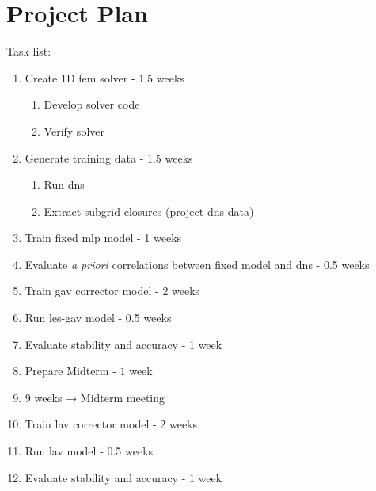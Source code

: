 \section{Project Plan} \label{sec:plan}

Task list:

\begin{enumerate}[label=\textbf{\color{titlecolor}\arabic*.}]
    \item Create 1D \gls{fem} solver - 1.5 weeks
    \begin{enumerate}[label=\textbf{\color{titlecolor}\arabic{enumi}.\alph*}]
        \item Develop solver code
        \item Verify solver
    \end{enumerate}

    \item Generate training data - 1.5 weeks
    \begin{enumerate}[label=\textbf{\color{titlecolor}\arabic{enumi}.\alph*}]
        \item Run \gls{dns}
        \item Extract subgrid closures (project \gls{dns} data)
    \end{enumerate}

    \item Train fixed \gls{mlp} model - 1 weeks

    \item Evaluate \emph{a priori} correlations between fixed model and \gls{dns} - 0.5 weeks

    \item Train \gls{gav} corrector model - 2 weeks

    \item Run \gls{les}-\gls{gav} model - 0.5 weeks

    \item Evaluate stability and accuracy - 1 week

    \item[] Prepare Midterm - $1$ week

    \item[] 9 weeks → Midterm meeting

    \item Train \gls{lav} corrector model - 2 weeks

    \item Run \gls{lav} model - 0.5 weeks

    \item Evaluate stability and accuracy - 1 week


\end{enumerate}
